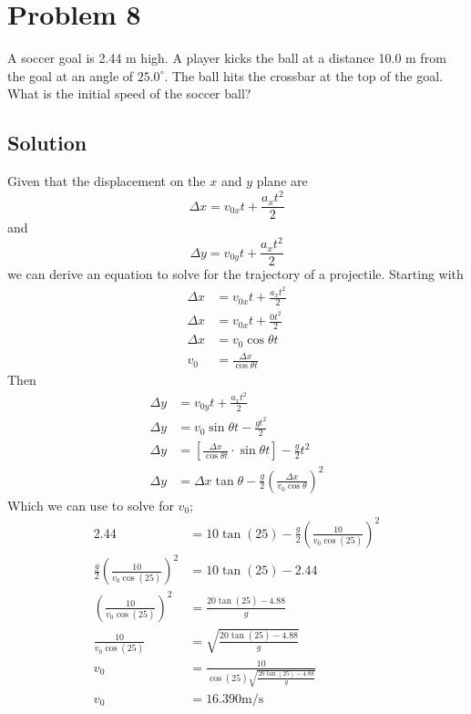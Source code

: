 \documentclass{article}
\begin{document}
\section*{Problem 8}
A soccer goal is 2.44 m high. A player kicks the ball at a distance 10.0 m from the goal at an angle of $25.0^\circ$.
The ball hits the crossbar at the top of the goal.
What is the initial speed of the soccer ball?

\subsection*{Solution}
Given that the displacement on the $x$ and $y$ plane are
\[
	\Delta x = v_{0x}t + \frac{a_xt^2}{2}
\]
and
\[
	\Delta y = v_{0y}t + \frac{a_xt^2}{2}
\]
we can derive an equation to solve for the trajectory of a projectile. Starting with
\begin{align*}
	\Delta x &= v_{0x}t + \frac{a_xt^2}{2} \\
	\Delta x &= v_{0x}t + \frac{0t^2}{2} \\
	\Delta x &= v_0 \cos\theta t \\
	v_0 &= \frac{\Delta x}{\cos\theta t}
\end{align*}
Then
\begin{align*}
	\Delta y &= v_{0y}t + \frac{a_xt^2}{2} \\
	\Delta y &= v_0\sin\theta t - \frac{gt^2}{2} \\
	\Delta y &= \left[ \frac{\Delta x}{\cos\theta t} \cdot \sin\theta t \right] - \frac{g}{2}t^2 \\
	\Delta y &= \Delta x \tan\theta - \frac{g}{2} \left( \frac{\Delta x}{v_0\cos\theta} \right)^2
\end{align*}
Which we can use to solve for $v_0$;
\begin{align*}
	2.44 &= 10 \tan(25) - \frac{g}{2} \left( \frac{10}{v_0\cos(25)} \right)^2 \\
	\frac{g}{2} \left( \frac{10}{v_0\cos(25)} \right)^2 &= 10 \tan(25) - 2.44 \\
	\left( \frac{10}{v_0\cos(25)} \right)^2 &= \frac{20\tan(25) - 4.88}{g} \\
	\frac{10}{v_0\cos(25)} &= \sqrt{\frac{20\tan(25) - 4.88}{g}} \\
	v_0 &= \frac{10}{\cos(25) \sqrt{\frac{20\tan(25) - 4.88}{g}}} \\
	v_0 &= 16.390 \text{m/s}
\end{align*}
\end{document}
